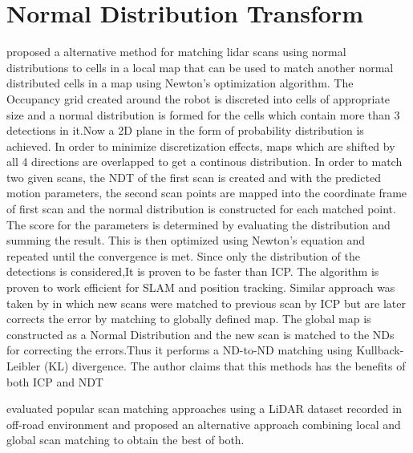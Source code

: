 \section{Normal Distribution Transform}
    \cite{P.Biber} proposed a alternative method for matching lidar scans using normal distributions to cells in a local map that can be used to match another normal distributed cells in a map using Newton's optimization 
algorithm. The Occupancy grid created around the robot is discreted into cells of appropriate size and a normal distribution is formed for the cells which contain more than 3 detections in it.Now a 2D plane in 
the form of probability distribution is achieved. In order to minimize discretization effects, maps which are shifted by all 4 directions are overlapped to get a continous distribution.
    In order to match two given scans, the NDT of the first scan is created and with the predicted motion parameters, the second scan points are mapped into the coordinate frame of first 
scan and the normal distribution is constructed for each matched point. The score for the parameters is determined by evaluating the distribution and summing the result. This is then optimized using
Newton's equation and repeated until the convergence is met. Since only the distribution of the detections is considered,It is proven to be faster than ICP.
 The algorithm is proven to work efficient for SLAM and position tracking.
    Similar approach was taken by \cite{K.Ryu} in which new scans were matched to previous scan by ICP but are later corrects the error by matching to globally defined map. The global map is constructed as a
Normal Distribution and the new scan is matched to the NDs for correcting the errors.Thus it performs a ND-to-ND matching using Kullback-Leibler (KL) divergence.
The author claims that this methods has the benefits of both ICP and NDT
\par
\cite{HaoFU} evaluated popular scan matching approaches using a LiDAR dataset recorded in off-road environment and proposed an alternative approach combining local and global  scan matching to obtain the 
best of both.

